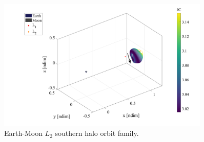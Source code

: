 \begin{figure}[ht]
    \centering
    \includegraphics[width=0.9\textwidth]{figures/L2HaloFamily.pdf}
    \caption{Earth-Moon $L_{2}$ southern halo orbit family.}
    \label{fig:L2Halo}
\end{figure}

